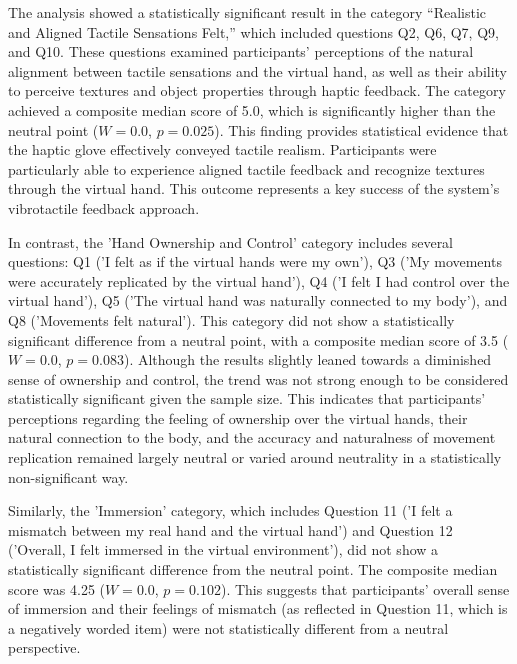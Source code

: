 The analysis showed a statistically significant result in the category “Realistic and Aligned Tactile Sensations Felt,” which included questions Q2, Q6, Q7, Q9, and Q10. These questions examined participants' perceptions of the natural alignment between tactile sensations and the virtual hand, as well as their ability to perceive textures and object properties through haptic feedback. The category achieved a composite median score of 5.0, which is significantly higher than the neutral point ($W = 0.0$, $p = 0.025$). This finding provides statistical evidence that the haptic glove effectively conveyed tactile realism. Participants were particularly able to experience aligned tactile feedback and recognize textures through the virtual hand. This outcome represents a key success of the system's vibrotactile feedback approach.

In contrast, the 'Hand Ownership and Control' category includes several questions: Q1 ('I felt as if the virtual hands were my own'), Q3 ('My movements were accurately replicated by the virtual hand'), Q4 ('I felt I had control over the virtual hand'), Q5 ('The virtual hand was naturally connected to my body'), and Q8 ('Movements felt natural'). This category did not show a statistically significant difference from a neutral point, with a composite median score of 3.5 ($W=0.0$, $p=0.083$). Although the results slightly leaned towards a diminished sense of ownership and control, the trend was not strong enough to be considered statistically significant given the sample size. This indicates that participants' perceptions regarding the feeling of ownership over the virtual hands, their natural connection to the body, and the accuracy and naturalness of movement replication remained largely neutral or varied around neutrality in a statistically non-significant way.

Similarly,  the 'Immersion' category, which includes Question 11 ('I felt a mismatch between my real hand and the virtual hand') and Question 12 ('Overall, I felt immersed in the virtual environment'), did not show a statistically significant difference from the neutral point. The composite median score was 4.25 ($W=0.0$, $p=0.102$). This suggests that participants' overall sense of immersion and their feelings of mismatch (as reflected in Question 11, which is a negatively worded item) were not statistically different from a neutral perspective.

